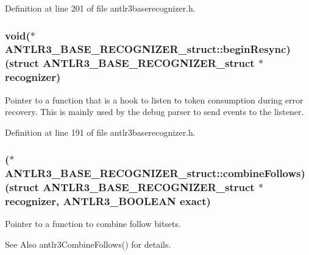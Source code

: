Definition at line 201 of file antlr3baserecognizer.\-h.

\hypertarget{struct_a_n_t_l_r3___b_a_s_e___r_e_c_o_g_n_i_z_e_r__struct_a20d026c8c4f6e0b5ba348fb67e90c07f}{
\subsubsection[{begin\-Resync}]{\setlength{\rightskip}{0pt plus 5cm}void($\ast$ A\-N\-T\-L\-R3\-\_\-\-B\-A\-S\-E\-\_\-\-R\-E\-C\-O\-G\-N\-I\-Z\-E\-R\-\_\-struct\-::begin\-Resync)(struct {\bf A\-N\-T\-L\-R3\-\_\-\-B\-A\-S\-E\-\_\-\-R\-E\-C\-O\-G\-N\-I\-Z\-E\-R\-\_\-struct} $\ast${\bf recognizer})}}\label{struct_a_n_t_l_r3___b_a_s_e___r_e_c_o_g_n_i_z_e_r__struct_a20d026c8c4f6e0b5ba348fb67e90c07f}
Pointer to a function that is a hook to listen to token consumption during error recovery. This is mainly used by the debug parser to send events to the listener. 

Definition at line 191 of file antlr3baserecognizer.\-h.

\hypertarget{struct_a_n_t_l_r3___b_a_s_e___r_e_c_o_g_n_i_z_e_r__struct_aad66611bf89411191906542a35c1e051}{
\subsubsection[{combine\-Follows}]{($\ast$ A\-N\-T\-L\-R3\-\_\-\-B\-A\-S\-E\-\_\-\-R\-E\-C\-O\-G\-N\-I\-Z\-E\-R\-\_\-struct\-::combine\-Follows)(struct {\bf A\-N\-T\-L\-R3\-\_\-\-B\-A\-S\-E\-\_\-\-R\-E\-C\-O\-G\-N\-I\-Z\-E\-R\-\_\-struct} $\ast${\bf recognizer}, {\bf A\-N\-T\-L\-R3\-\_\-\-B\-O\-O\-L\-E\-A\-N} exact)}}\label{struct_a_n_t_l_r3___b_a_s_e___r_e_c_o_g_n_i_z_e_r__struct_aad66611bf89411191906542a35c1e051}
Pointer to a function to combine follow bitsets. \begin{DoxySeeAlso}{See Also}
antlr3\-Combine\-Follows() for details. 
\end{DoxySeeAlso}


